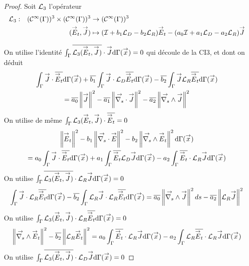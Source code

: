   \begin{proof}
    Soit \(\mathcal{L}_3\) l'opérateur
    \begin{equation}
      \label{eq:unicite:ci3:L3}
      \fonction{\LL_3}{(\mathcal{C}^\infty(\Gamma))^3 \times (\mathcal{C}^\infty(\Gamma))^3}{(\mathcal{C}^\infty(\Gamma))^3}
      {(\vE_t,\vJ)}{( \oI + b_1 \LD - b_2 \LR) \vE_t - (a_0\oI + a_1 \LD - a_2 \LR ) \vJ}
    \end{equation}

    On utilise l'identité \(\int_\Gamma {\overline{\mathcal{L}_3({\overset{\rightarrow}{E}}_t,{\overset{\rightarrow}{J}})}}\cdot {\overset{\rightarrow}{J}} \mathrm{d}{\Gamma}({\overset{\rightarrow}{x}}) = 0\) qui découle de la CI3, et dont on déduit
    \begin{multline}
      \label{eq:unicite:ci3:csu3-1}
      \int_\Gamma \vJ \cdot \conj{\vE_t}\dd{\Gamma}(\vx)   + \conj{b_1} \int_\Gamma \vJ\cdot \LD\conj{\vE_t}\dd{\Gamma}(\vx)  - \conj{b_2} \int_\Gamma \vJ \LR\conj{\vE_t}\dd{\Gamma}(\vx)  \\
      = \conj{a_0} \norm{\vJ}^2 - \conj{a_1} \norm{\vdivs \vJ}^2  - \conj{a_2} \norm{\vrots \vJ}^2 
    \end{multline}
    On utilise de même \(\int_\Gamma {\mathcal{L}_3({\overset{\rightarrow}{E}}_t,{\overset{\rightarrow}{J}})}\cdot {\overline{{\overset{\rightarrow}{E}}_t}} = 0\)
    \begin{multline}
      \label{eq:unicite:ci3:csu3-2}
      \norm{\vE_t}^2   - b_1 \norm{ \vdivs \vE }^2  - b_2 \norm{\vrots \vE_t}^2\dd{\Gamma}(\vx)  \\
      = a_0 \int_\Gamma \vJ\cdot \conj{\vE_t}\dd{\Gamma}(\vx) + a_1 \int_\Gamma \conj{\vE_t} \LD \vJ\dd{\Gamma}(\vx)  - a_2 \int_\Gamma \conj{\vE_t} \cdot \LR \vJ \dd{\Gamma}(\vx)
    \end{multline}
    On utilise \(\int_\Gamma {\overline{\mathcal{L}_3({\overset{\rightarrow}{E}}_t,{\overset{\rightarrow}{J}})}}\cdot{\mathcal{L}_R}{\overset{\rightarrow}{J}}\mathrm{d}{\Gamma}({\overset{\rightarrow}{x}}) = 0\)
    \begin{equation}
      \label{eq:unicite:ci3:csu3-3}
      \int_\Gamma \vJ \cdot \LR \conj{\vE_t}\dd{\Gamma}(\vx)   - \conj{b_2} \int_\Gamma \LR \vJ \cdot \LR \conj{\vE_t}\dd{\Gamma}(\vx)
      =  \conj{a_0} \norm{ \vrots \vJ}^2ds - \conj{a_2} \norm{ \LR \vJ}^2 
    \end{equation}
    On utilise \(\int_\Gamma {\mathcal{L}_3({\overset{\rightarrow}{E}}_t,{\overset{\rightarrow}{J}})}\cdot{\mathcal{L}_R}{\overline{{\overset{\rightarrow}{E}}_t}}\mathrm{d}{\Gamma}({\overset{\rightarrow}{x}})=0\)
    \begin{equation}
      \label{eq:unicite:ci3:csu3-4}
      \norm{ \vrots \vE_t }^2   - \conj{b_2} \norm{ \LR \vE_t}^2 
      = a_0 \int_\Gamma \conj{\vE_t} \cdot \LR \vJ \dd{\Gamma}(\vx) - a_2 \int_\Gamma \LR \conj{\vE_t} \cdot \LR \vJ \dd{\Gamma}(\vx)
    \end{equation}
    On utilise \(\int_\Gamma {\overline{\mathcal{L}_3({\overset{\rightarrow}{E}}_t,{\overset{\rightarrow}{J}})}}\cdot{\mathcal{L}_D}{\overset{\rightarrow}{J}}\mathrm{d}{\Gamma}({\overset{\rightarrow}{x}})=0\)

\end{proof}
